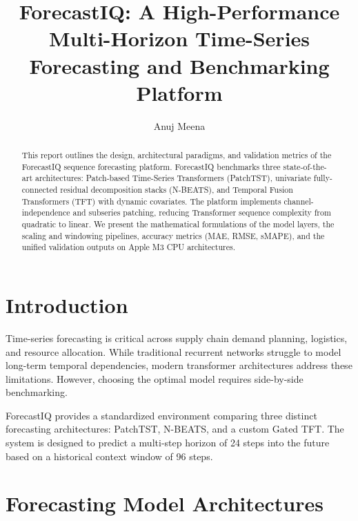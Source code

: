\documentclass[11pt,journal,onecolumn]{IEEEtran}
\begin{document}
\title{ForecastIQ: A High-Performance Multi-Horizon Time-Series Forecasting and Benchmarking Platform}
\author{Anuj Meena}
\maketitle

\begin{abstract}
This report outlines the design, architectural paradigms, and validation metrics of the ForecastIQ sequence forecasting platform. ForecastIQ benchmarks three state-of-the-art architectures: Patch-based Time-Series Transformers (PatchTST), univariate fully-connected residual decomposition stacks (N-BEATS), and Temporal Fusion Transformers (TFT) with dynamic covariates. The platform implements channel-independence and subseries patching, reducing Transformer sequence complexity from quadratic to linear. We present the mathematical formulations of the model layers, the scaling and windowing pipelines, accuracy metrics (MAE, RMSE, sMAPE), and the unified validation outputs on Apple M3 CPU architectures.
\end{abstract}

\section{Introduction}
Time-series forecasting is critical across supply chain demand planning, logistics, and resource allocation. While traditional recurrent networks struggle to model long-term temporal dependencies, modern transformer architectures address these limitations. However, choosing the optimal model requires side-by-side benchmarking.

ForecastIQ provides a standardized environment comparing three distinct forecasting architectures: PatchTST, N-BEATS, and a custom Gated TFT. The system is designed to predict a multi-step horizon of 24 steps into the future based on a historical context window of 96 steps.

\section{Forecasting Model Architectures}
\end{document}
